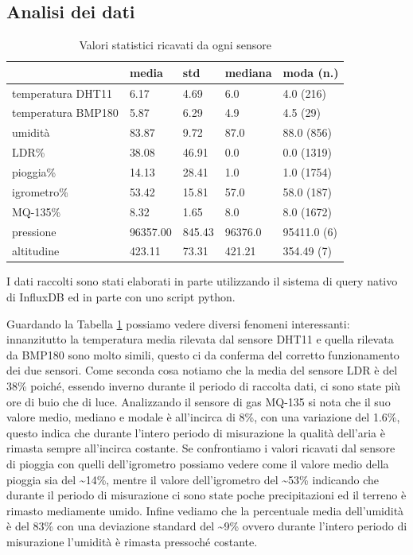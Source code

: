 \documentclass[a4paper, 12pt]{report}
\begin{document}
\subsection*{Analisi dei dati}
\vspace{0.5cm}

\begin{table}
  \centering
\begin{tabular}{ l l l l l }
  \hline
   & media & std & mediana & moda (n.) \\
  \hline
  temperatura DHT11 & 6.17 & 4.69 & 6.0 & 4.0 (216) \\
  temperatura BMP180 & 5.87 & 6.29 & 4.9 & 4.5 (29) \\
  umidità & 83.87 & 9.72 & 87.0 & 88.0 (856) \\
  LDR\% & 38.08 & 46.91 & 0.0 & 0.0 (1319) \\
  pioggia\% & 14.13 & 28.41 & 1.0 & 1.0 (1754) \\
  igrometro\% & 53.42 & 15.81 & 57.0 & 58.0 (187) \\
  MQ-135\% & 8.32 & 1.65 & 8.0 & 8.0 (1672) \\
  pressione & 96357.00 & 845.43 & 96376.0 & 95411.0 (6) \\
  altitudine & 423.11 & 73.31 & 421.21 & 354.49 (7) \\
  \hline
\end{tabular}
\caption{ Valori statistici ricavati da ogni sensore }
\label{tab:all_data_stats}
\end{table}

I dati raccolti sono stati elaborati in parte utilizzando il sistema di query nativo di InfluxDB\cite{flux} ed in parte con uno script python\cite{python}.

Guardando la Tabella \ref{tab:all_data_stats} possiamo vedere diversi fenomeni interessanti: innanzitutto la temperatura media rilevata dal sensore DHT11 e quella rilevata da BMP180 sono molto simili, 
questo ci da conferma del corretto funzionamento dei due sensori. Come seconda cosa notiamo che la media del sensore LDR è del 38\% poiché, essendo inverno durante il periodo di raccolta dati, 
ci sono state più ore di buio che di luce. Analizzando il sensore di gas MQ-135 si nota che il suo valore medio, mediano e modale è all'incirca di 8\%, con una variazione del 1.6\%, questo indica 
che durante l'intero periodo di misurazione la qualità dell'aria è rimasta sempre all'incirca costante. Se confrontiamo i valori ricavati dal sensore di pioggia con quelli dell'igrometro possiamo vedere 
come il valore medio della pioggia sia del \textasciitilde14\%, mentre il valore dell'igrometro del
\textasciitilde53\% indicando che durante il periodo di misurazione ci sono state poche precipitazioni ed il terreno è rimasto mediamente umido. Infine vediamo che la percentuale media dell'umidità è 
del 83\% con una deviazione standard del \textasciitilde9\% ovvero durante l'intero periodo di misurazione l'umidità è rimasta pressoché costante.
\end{document}
